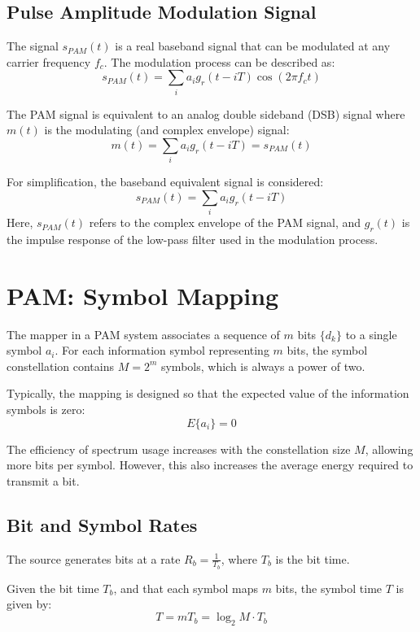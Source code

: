 \subsection*{Pulse Amplitude Modulation Signal}

The signal \( s_{PAM}(t) \) is a real baseband signal that can be modulated at any carrier frequency \( f_c \). The modulation process can be described as:
\[ s_{PAM}(t) = \sum_i a_i g_r(t - iT) \cos(2\pi f_c t) \]

The PAM signal is equivalent to an analog double sideband (DSB) signal where \( m(t) \) is the modulating (and complex envelope) signal:
\[ m(t) = \sum_i a_i g_r(t - iT) = s_{PAM}(t) \]

For simplification, the baseband equivalent signal is considered:
\[ s_{PAM}(t) = \sum_i a_i g_r(t - iT) \]
Here, \( s_{PAM}(t) \) refers to the complex envelope of the PAM signal, and \( g_r(t) \) is the impulse response of the low-pass filter used in the modulation process.

\section*{PAM: Symbol Mapping}

The mapper in a PAM system associates a sequence of \( m \) bits \( \{d_k\} \) to a single symbol \( a_i \). For each information symbol representing \( m \) bits, the symbol constellation contains \( M = 2^m \) symbols, which is always a power of two.

Typically, the mapping is designed so that the expected value of the information symbols is zero:
\[ E\{a_i\} = 0 \]

The efficiency of spectrum usage increases with the constellation size \( M \), allowing more bits per symbol. However, this also increases the average energy required to transmit a bit.

\subsection*{Bit and Symbol Rates}

The source generates bits at a rate \( R_b = \frac{1}{T_b} \), where \( T_b \) is the bit time.

Given the bit time \( T_b \), and that each symbol maps \( m \) bits, the symbol time \( T \) is given by:
\[ T = mT_b = \log_2 M \cdot T_b \]

